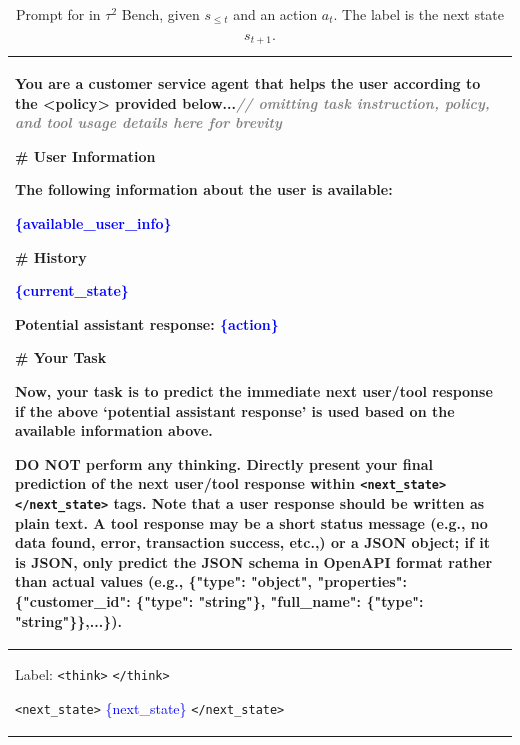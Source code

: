 \begin{table}[t!]
    \caption{Prompt for \wmsftshort{} in $\tau^{2}$ Bench, given $s_{\le t}$ and an action $a_t$. The label is the next state $s_{t+1}$.}
    \label{tab:tau2_wmsft_prompt}
    \begin{tabular}{p{16.5cm}}
    \toprule
    You are a customer service agent that helps the user according to the <policy> provided below...\emph{\textcolor{gray}{// omitting task instruction, policy, and tool usage details here for brevity}}
    \newline

    \# User Information

    The following information about the user is available:

    \textcolor{blue}{\{}\textcolor{blue}{available\_user\_info}\textcolor{blue}{\}}
    \newline

    \# History

    \textcolor{blue}{\{}\textcolor{blue}{current\_state}\textcolor{blue}{\}}


    \textbf{Potential assistant response:}
    \textcolor{blue}{\{}\textcolor{blue}{action}\textcolor{blue}{\}}
    \newline


    \# Your Task

    Now, your task is to predict the immediate next user/tool response if the above `potential assistant response' is used based on the available information above.

    DO NOT perform any thinking. Directly present your final prediction of the next user/tool response within \texttt{<next\_state>} \texttt{</next\_state>} tags. Note that a user response should be written as plain text. A tool response may be a short status message (e.g., no data found, error, transaction success, etc.,) or a JSON object; if it is JSON, only predict the JSON schema in OpenAPI format rather than actual values (e.g., \{"type": "object", "properties": \{"customer\_id": \{"type": "string"\}, "full\_name": \{"type": "string"\}\},...\}).
    \\
    \midrule
    Label: \texttt{<think>} \texttt{</think>}

    \texttt{<next\_state>} \textcolor{blue}{\{}\textcolor{blue}{next\_state}\textcolor{blue}{\}} \texttt{</next\_state>}
    \\
    \bottomrule
    \end{tabular}
\end{table}